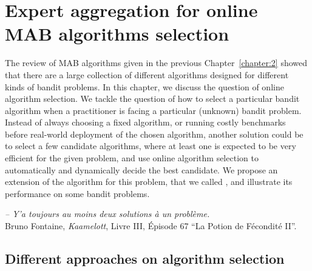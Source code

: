 
\chapter{Expert aggregation for online MAB algorithms selection}
\label{chapter:25}

\graphicspath{{2-Chapters/2-Chapter/Images/}}

\abstractStartChapter{}%
%
The review of MAB algorithms given in the previous Chapter~\ref{chapter:2} showed that there are a large collection of different algorithms designed for different kinds of bandit problems.
In this chapter, we discuss the question of online algorithm selection.
%
We tackle the question of how to select a particular bandit algorithm when a practitioner is facing a particular (unknown) bandit problem.
Instead of always choosing a fixed algorithm, or running costly benchmarks before real-world deployment of the chosen algorithm, another solution could be to select a few candidate algorithms, where at least one is expected to be very efficient for the given problem, and use online algorithm selection to automatically and dynamically decide the best candidate.
We propose an extension of the \ExpFour{} algorithm for this problem, that we called \Aggr, and illustrate its performance on some bandit problems.


\begin{small}
    \begin{flushright}
        \emph{-- Y'a toujours au moins deux solutions à un problème.}\\
        Bruno Fontaine, \emph{Kaamelott}, Livre III, Épisode 67 ``La Potion de Fécondité II''.
    \end{flushright}
\end{small}


\minitocStartChapter{}


\section{Different approaches on algorithm selection}
\label{sec:25:chooseYourPreferredBanditAlgorithm}

